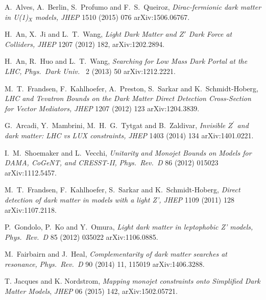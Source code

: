  A.~Alves, A.~Berlin, S.~Profumo and F.~S.~Queiroz,
\emph{Dirac-fermionic dark matter in U(1)$_{X}$ models,}
  \emph{JHEP} 1510 (2015) 076
  arXiv:1506.06767. %

 H.~An, X.~Ji and L.~T.~Wang,
   \emph{Light Dark Matter and $Z'$ Dark Force at Colliders,}
    \emph{JHEP} 1207 (2012) 182, arXiv:1202.2894.

 H.~An, R.~Huo and L.~T.~Wang,
\emph{Searching for Low Mass Dark Portal at the LHC,}
  \emph{Phys.\ Dark Univ.\ } 2 (2013) 50
  arXiv:1212.2221. %

 M.~T.~Frandsen, F.~Kahlhoefer, A.~Preston, S.~Sarkar and K.~Schmidt-Hoberg,
\emph{LHC and Tevatron Bounds on the Dark Matter Direct Detection Cross-Section for Vector Mediators,}
  \emph{JHEP} 1207 (2012) 123
  arXiv:1204.3839. %

 G.~Arcadi, Y.~Mambrini, M.~H.~G.~Tytgat and B.~Zaldivar,
\emph{Invisible $Z^\prime$ and dark matter: LHC vs LUX constraints,}
  \emph{JHEP} 1403 (2014) 134
  arXiv:1401.0221. %

 I.~M.~Shoemaker and L.~Vecchi,
\emph{Unitarity and Monojet Bounds on Models for DAMA, CoGeNT, and CRESST-II,}
  \emph{Phys.\ Rev.\ D} 86 (2012) 015023
  arXiv:1112.5457. %

 M.~T.~Frandsen, F.~Kahlhoefer, S.~Sarkar and K.~Schmidt-Hoberg,
\emph{Direct detection of dark matter in models with a light Z',}
  \emph{JHEP} 1109 (2011) 128
  arXiv:1107.2118. %

 P.~Gondolo, P.~Ko and Y.~Omura,
\emph{Light dark matter in leptophobic Z' models,}
  \emph{Phys.\ Rev.\ D} 85 (2012) 035022
  arXiv:1106.0885. %

 M.~Fairbairn and J.~Heal,
\emph{Complementarity of dark matter searches at resonance,}
  \emph{Phys.\ Rev.\ D} 90 (2014) 11,  115019
  arXiv:1406.3288. %


 T. Jacques and K. Nordstrom, \emph{Mapping monojet constraints onto Simplified Dark Matter Models}, \emph{JHEP} 06 (2015) 142, arXiv:1502.05721.

